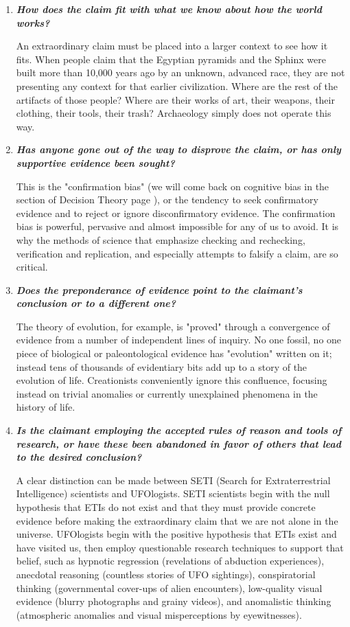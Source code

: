 \begin{enumerate}
		\item \textit{\textbf{How does the claim fit with what we know about how the world works?}}

		An extraordinary claim must be placed into a larger context to see how it fits. When people claim that the Egyptian pyramids and the Sphinx were built more than 10,000 years ago by an unknown, advanced race, they are not presenting any context for that earlier civilization. Where are the rest of the artifacts of those people? Where are their works of art, their weapons, their clothing, their tools, their trash? Archaeology simply does not operate this way.

		\item \textit{\textbf{Has anyone gone out of the way to disprove the claim, or has only supportive evidence been sought?}}

		This is the "confirmation bias" (we will come back on cognitive bias in the section of Decision Theory page \pageref{cognitive bias}), or the tendency to seek confirmatory evidence and to reject or ignore disconfirmatory evidence. The confirmation bias is powerful, pervasive and almost impossible for any of us to avoid. It is why the methods of science that emphasize checking and rechecking, verification and replication, and especially attempts to falsify a claim, are so critical. 

		\item \textit{\textbf{Does the preponderance of evidence point to the claimant's conclusion or to a  different one?}}

		The theory of evolution, for example, is "proved" through a convergence of evidence from a number of independent lines of inquiry. No one fossil, no one piece of biological or paleontological evidence has "evolution" written on it; instead tens of thousands of evidentiary bits add up to a story of the evolution of life. Creationists conveniently ignore this confluence, focusing instead on trivial anomalies or currently unexplained phenomena in the history of life.

		\item \textit{\textbf{Is the claimant employing the accepted rules of reason and tools of research, or have these been abandoned in favor of others that lead to the desired conclusion?}} 

		A clear distinction can be made between SETI (Search for Extraterrestrial Intelligence) scientists and UFOlogists. SETI scientists begin with the null hypothesis that ETIs do not exist and that they must provide concrete evidence before making the extraordinary claim that we are not alone in the universe. UFOlogists begin with the positive hypothesis that ETIs exist and have visited us, then employ questionable research techniques to support that belief, such as hypnotic regression (revelations of abduction experiences), anecdotal reasoning (countless stories of UFO sightings), conspiratorial thinking (governmental cover-ups of alien encounters), low-quality visual evidence (blurry photographs and grainy videos), and anomalistic thinking (atmospheric anomalies and visual misperceptions by eyewitnesses).


\end{enumerate}

